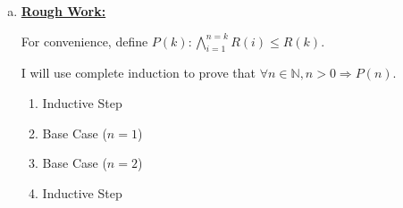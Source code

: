 \documentclass[12pt]{article}
\begin{document}
\begin{enumerate}[a.]

    \item

    \bigskip

    \begin{mdframed}
        \underline{\textbf{Rough Work:}}

        \bigskip

        For convenience, define $P(k): \bigwedge\limits_{i=1}^{n=k}R(i) \leq R(k)$.

        \bigskip

        I will use complete induction to prove that $\forall n \in \mathbb{N},
        n > 0 \Rightarrow P(n)$.

        \bigskip

        \begin{enumerate}[1.]
            \item Inductive Step
            \item Base Case ($n = 1$)
            \item Base Case ($n = 2$)

            \begin{mdframed}

            \end{mdframed}

            \item Inductive Step
        \end{enumerate}
    \end{mdframed}
\end{enumerate}
\end{document}
